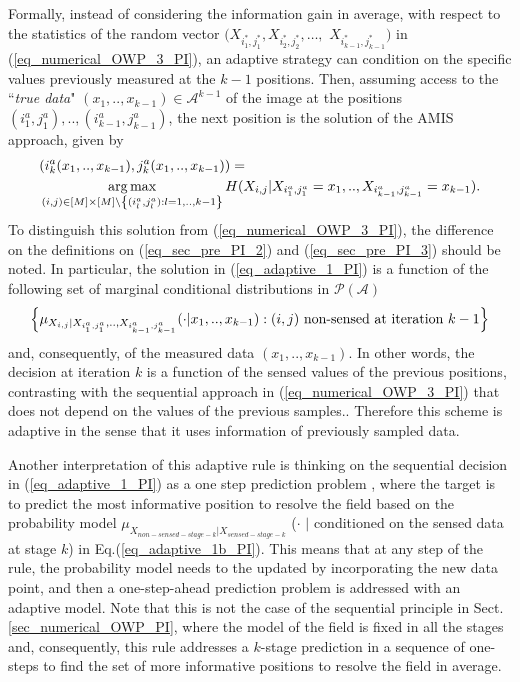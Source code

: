 Formally, instead of considering the information gain in average, with respect to  the statistics of the random vector $(X_{i^*_1,j^*_1}, X_{i^*_2,j^*_2},\ldots,$ $X_{i^*_{k-1},j^*_{k-1}})$ in (\ref{eq_numerical_OWP_3_PI}), an adaptive strategy can condition on the specific values previously measured at the $k-1$ positions. Then, assuming access to the ``{\em true data}" $(x_1,..,x_{k-1})\in \mathcal{A}^{k-1}$ of the image at the positions $(i^a_1,j^a_1),..,(i^a_{k-1},j^a_{k-1})$, the next position is the solution of the AMIS approach, given by%
\begin{align}\label{eq_adaptive_1_PI}
	&(i^a_k(x_1,..,x_{k-1}),j^a_k(x_1,..,x_{k-1})) =\nonumber\\ 
	& \operatorname*{arg\,max}_{(i,j)\in [M]\times [M] \setminus \left\{(i^a_l,j^a_l): l=1,..,k-1\right\}} H(X_{i,j}|X_{i^a_1,j^a_1}=x_1,..,X_{i^a_{k-1},j^a_{k-1}}=x_{k-1}).
\end{align}
To distinguish this solution from (\ref{eq_numerical_OWP_3_PI}), the difference on the definitions on 
(\ref{eq_sec_pre_PI_2}) and (\ref{eq_sec_pre_PI_3}) should be noted. In particular, the solution in (\ref{eq_adaptive_1_PI}) is a function of the following set of marginal conditional distributions in $\mathcal{P}(\mathcal{A})$
\begin{align}\label{eq_adaptive_1b_PI}
\left\{\mu_{X_{i,j}| X_{i^a_1,j^a_1},..,X_{i^a_{k-1},j^a_{k-1}}}(\cdot | x_1,..,x_{k-1}) : (i,j) \textnormal{ non-sensed at iteration } k-1\right\}
\end{align}
and, consequently, of the measured data $(x_1,..,x_{k-1})$. In other words, 
the decision at iteration $k$ is a function of the sensed values of the previous positions, {contrasting with the sequential approach in (\ref{eq_numerical_OWP_3_PI}) that does not depend on the values of the previous samples.}. Therefore this scheme is adaptive in the sense that it uses information of previously sampled data. 
\begin{remark}
\label{remark_prediction_inter_seq_PI}
Another interpretation of this adaptive rule is thinking on the sequential decision in (\ref{eq_adaptive_1_PI})
as a one step prediction problem \citep{gray_2004}, where the target is to predict the most informative position to resolve the field based on the probability model $\mu_{X_{non-sensed-stage-k} | X_{sensed-stage-k}}$ ($\cdot$ $|$ conditioned on the sensed data at stage $k$) in Eq.(\ref{eq_adaptive_1b_PI}). This means that at any step of the rule, the probability model needs to the updated by incorporating the new data point, and then a one-step-ahead prediction problem is addressed with an adaptive model. Note that this is not the case of the sequential principle in Sect. \ref{sec_numerical_OWP_PI}, where the model of the field is fixed in all the stages and, consequently, this rule addresses a $k$-stage prediction in a sequence of one-steps to find the set of more informative positions to resolve the field in average. \end{remark}

